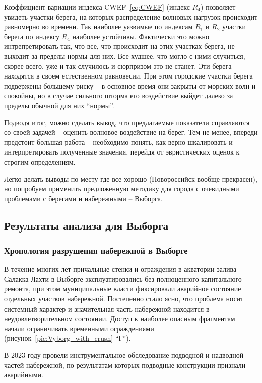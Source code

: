 Коэффициент вариации индекса CWEF~\eqref{eq:CWEF} (индекс $R_4$) позволяет увидеть участки берега, на которых распределение волновых нагрузок происходит равномерно во времени.
Так наиболее уязвимые по индексам $R_1$ и $R_2$ участки берега по индексу $R_4$ наиболее устойчивы.
Фактически это можно интрепретировать так, что все, что происходит на этих участках берега, не выходит за пределы нормы для них.
Все худшее, что могло с ними случиться, скорее всего, уже и так случилось и сюрпризом это не станет.
Эти берега находятся в своем естественном равновесии.
При этом городские участки берега подвержены большему риску -- в основное время они закрыты от морских волн и спокойны, но в случае сильного шторма его воздействие выйдет далеко за пределы обычной для них \enquote{нормы}.

Подводя итог, можно сделать вывод, что предлагаемые показатели справляются со своей задачей -- оценить волновое воздействие на берег.
Тем не менее, впереди предстоит большая работа -- необходимо понять, как верно шкалировать и интерпретировать полученные значения, перейдя от эвристических оценок к строгим определениям.

Легко делать выводы по месту где все хорошо (Новороссийск вообще прекрасен), но попробуем применить предложенную методику для города с очевидными проблемами с берегами и набережными -- Выборга.



\subsection{Результаты анализа для Выборга}

\subsubsection{Хронология разрушения набережной в Выборге}

В течение многих лет причальные стенки и ограждения в акватории залива Салакка-Лахти в Выборге эксплуатировались без полноценного капитального ремонта, при этом муниципальные власти фиксировали аварийное состояние отдельных участков набережной. 
Постепенно стало ясно, что проблема носит системный характер и значительная часть набережной находится в неудовлетворительном состоянии.
Доступ к наиболее опасным фрагментам начали ограничивать временными ограждениями (рисунок~\ref{pic:Vyborg_with_crush} \enquote{Г}).

В 2023 году провели инструментальное обследование подводной и надводной частей набережной, по результатам которых подводные конструкции признали аварийными.

